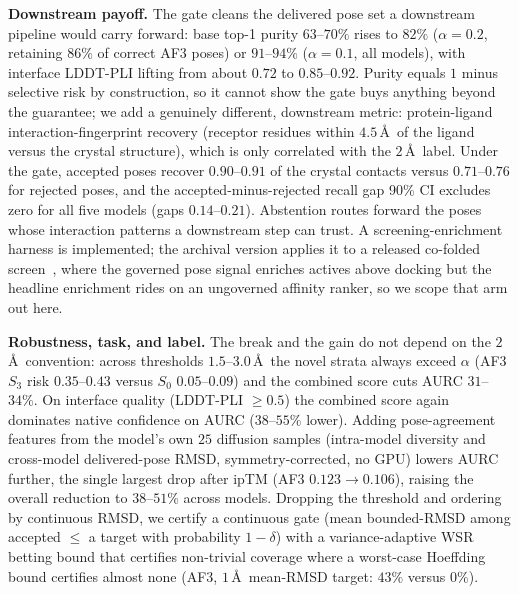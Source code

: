 \documentclass[10pt]{article}
\begin{document}
\textbf{Downstream payoff.} The gate cleans the delivered pose set a downstream pipeline would carry
forward: base top-1 purity $63$--$70\%$ rises to $82\%$ ($\alpha=0.2$, retaining $86\%$ of correct AF3
poses) or $91$--$94\%$ ($\alpha=0.1$, all models), with interface LDDT-PLI lifting from about $0.72$ to
$0.85$--$0.92$. Purity equals $1$ minus selective risk by construction, so it cannot show the gate buys
anything beyond the guarantee; we add a genuinely different, downstream metric: protein-ligand
interaction-fingerprint recovery (receptor residues within $4.5$\,\AA\ of the ligand versus the crystal
structure), which is only correlated with the $2$\,\AA\ label. Under the gate, accepted poses recover
$0.90$--$0.91$ of the crystal contacts versus $0.71$--$0.76$ for rejected poses, and the
accepted-minus-rejected recall gap 90\% CI excludes zero for all five models (gaps $0.14$--$0.21$).
Abstention routes forward the poses whose interaction patterns a downstream step can trust. A
screening-enrichment harness is implemented; the archival version applies it to a released co-folded
screen~\citep{shen2026vs}, where the governed pose signal enriches actives above docking but the
headline enrichment rides on an ungoverned affinity ranker, so we scope that arm out here.

\textbf{Robustness, task, and label.} The break and the gain do not depend on the $2$\,\AA\ convention:
across thresholds $1.5$--$3.0$\,\AA\ the novel strata always exceed $\alpha$ (AF3 $S_3$ risk
$0.35$--$0.43$ versus $S_0$ $0.05$--$0.09$) and the combined score cuts AURC $31$--$34\%$. On interface
quality (LDDT-PLI $\ge 0.5$) the combined score again dominates native confidence on AURC
($38$--$55\%$ lower). Adding pose-agreement features from the model's own $25$ diffusion samples
(intra-model diversity and cross-model delivered-pose RMSD, symmetry-corrected, no GPU) lowers AURC
further, the single largest drop after ipTM (AF3 $0.123\to0.106$), raising the overall reduction to
$38$--$51\%$ across models. Dropping the threshold and ordering by continuous RMSD, we certify a
continuous gate (mean bounded-RMSD among accepted $\le$ a target with probability $1-\delta$) with a
variance-adaptive WSR betting bound that certifies non-trivial coverage where a worst-case Hoeffding
bound certifies almost none (AF3, $1$\,\AA\ mean-RMSD target: $43\%$ versus $0\%$).
\end{document}
